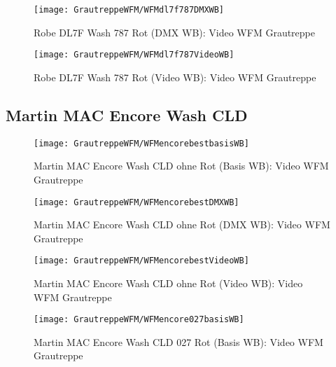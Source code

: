\documentclass[pagesize,paper=A4,fontsize=12pt,utf8,numbers=noenddot,bibliography=totoc,listof=totoc,DIV=11,BCOR=1mm]{scrreprt}
\begin{document}
\begin{figure}[htp]     %
\centering
\texttt{[image: GrautreppeWFM/WFMdl7f787DMXWB]} 
\caption {Robe DL7F Wash 787 Rot (DMX WB): Video WFM Grautreppe} 
\end{figure}

\begin{figure}[htp]     %
\centering
\texttt{[image: GrautreppeWFM/WFMdl7f787VideoWB]} 
\caption {Robe DL7F Wash 787 Rot (Video WB): Video WFM Grautreppe} 
\end{figure}


\subsection{Martin MAC Encore Wash CLD}

\begin{figure}[htp]     %
\centering
\texttt{[image: GrautreppeWFM/WFMencorebestbasisWB]} 
\caption {Martin MAC Encore Wash CLD ohne Rot (Basis WB): Video WFM Grautreppe} 
\end{figure}

\begin{figure}[htp]     %
\centering
\texttt{[image: GrautreppeWFM/WFMencorebestDMXWB]} 
\caption {Martin MAC Encore Wash CLD ohne Rot (DMX WB): Video WFM Grautreppe} 
\end{figure}

\begin{figure}[htp]     %
\centering
\texttt{[image: GrautreppeWFM/WFMencorebestVideoWB]} 
\caption {Martin MAC Encore Wash CLD ohne Rot (Video WB): Video WFM Grautreppe} 
\end{figure}



\begin{figure}[htp]     %
\centering
\texttt{[image: GrautreppeWFM/WFMencore027basisWB]} 
\caption {Martin MAC Encore Wash CLD 027 Rot (Basis WB): Video WFM Grautreppe} 
\end{figure}
\end{document}
